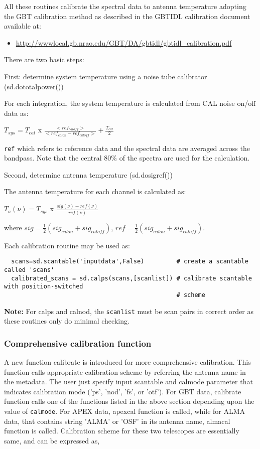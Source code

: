 All these routines calibrate the spectral data to antenna temperature
adopting the GBT calibration method as described in the
GBTIDL calibration document available at: 
\begin{itemize}
   \item \url{http://wwwlocal.gb.nrao.edu/GBT/DA/gbtidl/gbtidl_calibration.pdf}
\end{itemize}
There are two basic steps:

First: determine system temperature using a noise tube calibrator
(sd.dototalpower()) 

For each integration, the system temperature is calculated from
CAL noise on/off data as:

$ T_{sys} = T_{cal}$ x 
$\frac{<ref_{caloff}>}{<ref_{calon} - ref_{caloff}>} + \frac{T_{cal}}{2} $

{\tt ref} which refers to reference data and the spectral data are averaged
across the bandpass.  Note that the central 80\% of the spectra are
used for the calculation.

Second, determine antenna temperature (sd.dosigref())

The antenna temperature for each channel is calculated as:

$ T_a(\nu) = T_{sys}$ x 
$\frac{sig(\nu) - ref(\nu)}{ref(\nu)}$

where $sig = \frac{1}{2}(sig_{calon} + sig_{caloff})$, 
      $ref = \frac{1}{2}(sig_{calon} + sig_{caloff}).$


Each calibration routine may be used as:


\small
\begin{verbatim}
  scans=sd.scantable('inputdata',False)         # create a scantable called 'scans'
  calibrated_scans = sd.calps(scans,[scanlist]) # calibrate scantable with position-switched 
                                                # scheme
\end{verbatim}
\normalsize


{\bf Note:} For calps and calnod, the {\tt scanlist} must be scan pairs in
correct order as these routines only do minimal checking.

\subsubsection{Comprehensive calibration function}
A new function calibrate is introduced for more comprehensive
calibration. This function calls appropriate calibration scheme by
referring the antenna name in the metadata. The user just specify input
scantable and calmode parameter that indicates calibration mode ('ps',
'nod', 'fs', or 'otf'). For GBT data, calibrate function calls one of
the functions listed in the above section depending upon the value of
{\tt calmode}. For APEX data, apexcal function is called, while for ALMA
data, that contains string 'ALMA' or 'OSF' in its antenna name, almacal
function is called. Calibration scheme for these two telescopes are
essentially same, and can be expressed as,

